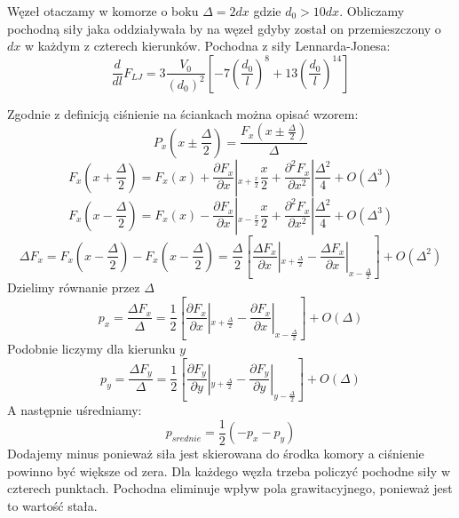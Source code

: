 \documentclass[12pt, letterpaper]{report}
\begin{document}
    Węzeł otaczamy w komorze o boku $\Delta = 2 dx$ gdzie $d_0 > 10 dx$. 
    Obliczamy pochodną siły jaka oddziaływała by na węzeł gdyby został 
    on przemieszczony o $dx$ w każdym z czterech kierunków. Pochodna z siły Lennarda-Jonesa:
    \begin{equation}
        \frac{d}{dl} F_{LJ} = 3\frac{V_0}{(d_0)^2} \left[ -7 \left(\frac{d_0}{l}\right)^{8} + 13 \left(\frac{d_0}{l}\right)^{14} \right]
    \end{equation}
    
    Zgodnie z definicją ciśnienie na ściankach można opisać wzorem:
    \begin{equation}
        P_x (x \pm \frac{\Delta}{2}) = \frac{F_x (x \pm \frac{\Delta}{2})}{\Delta}
    \end{equation}
    \begin{equation}
        F_x (x + \frac{\Delta}{2}) = F_x (x) + \frac{\partial F_x}{\partial x} 
        \left| _{x + \frac{x}{2}}  \frac{x}{2} + \frac{\partial^2 F_x}{\partial x^2 }  \right| \frac{\Delta^2}{4} + O(\Delta^3)
    \end{equation}
    \begin{equation}
        F_x (x - \frac{\Delta}{2}) = F_x (x) - \frac{\partial F_x}{\partial x} 
        \left| _{x - \frac{x}{2}}  \frac{x}{2} + \frac{\partial^2 F_x}{\partial x^2 }  \right| \frac{\Delta^2}{4} + O(\Delta^3)
    \end{equation} 
    \begin{equation}
        \Delta F_x = 
        F_x (x - \frac{\Delta}{2}) - F_x (x - \frac{\Delta}{2}) = 
        \frac{\Delta}{2} \left[ \frac{\Delta F_x}{\partial x} |_{x + \frac{\Delta}{2}}  -
          \frac{\Delta F_x}{\partial x}|_{x - \frac{\Delta}{2}} \right] + O(\Delta^2)
    \end{equation}
    Dzielimy równanie przez $\Delta$
    \begin{equation}
        p_x = \frac{\Delta F_x}{\Delta} = \frac{1}{2} 
        \left[ \frac{\partial F_x}{\partial x} |_{x + \frac{\Delta}{2}} - \frac{\partial F_x}{\partial x} |_{x - \frac{\Delta}{2}} \right] + O(\Delta)
    \end{equation}
    Podobnie liczymy dla kierunku $y$
    \begin{equation}
        p_y = \frac{\Delta F_y}{\Delta} = \frac{1}{2} 
        \left[ \frac{\partial F_y}{\partial y} |_{y + \frac{\Delta}{2}} - \frac{\partial F_y}{\partial y} |_{y - \frac{\Delta}{2}} \right] + O(\Delta)
    \end{equation}
    A następnie uśredniamy:
    \begin{equation}
        p_{srednie} = \frac{1}{2} \left( -p_x - p_y \right)
    \end{equation}
    Dodajemy minus ponieważ siła jest skierowana do środka komory a ciśnienie powinno być większe od zera. 
    Dla każdego węzła trzeba policzyć pochodne siły w czterech punktach. 
    Pochodna eliminuje wpływ pola grawitacyjnego, ponieważ jest to wartość stała.
\end{document}
